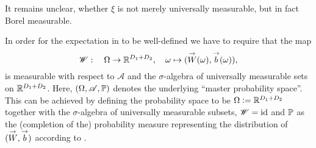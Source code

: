 It remains unclear, whether $\xi$ is not merely universally measurable, but in fact Borel measurable. 

In order for the expectation in  to be well-defined we have to require that the map
\begin{equation*}
\mathscr{W}: \quad \Omega \to \mathbb{R}^{D_1 + D_2}, \quad \omega \mapsto (\overset{\rightarrow}{W}(\omega), \overset{\rightarrow}{b}(\omega)),
\end{equation*}
is measurable with respect to $\mathscr{A}$ and the $\sigma$-algebra of universally measurable sets on $\mathbb{R}^{D_1 + D_2}$. Here, $(\Omega, \mathscr{A}, \mathbb{P})$ denotes the underlying ``master probability space''. This can be achieved by defining the probability space to be $\Omega \mathrel{\mathop:}= \mathbb{R}^{D_1 + D_2}$ together with the $\sigma$-algebra of universally measurable subsets, $\mathscr{W} = \operatorname{id}$ and $\mathbb{P}$ as the (completion of the) probability measure representing the distribution of $(\overset{\rightarrow}{W}, \overset{\rightarrow}{b})$ according to .
